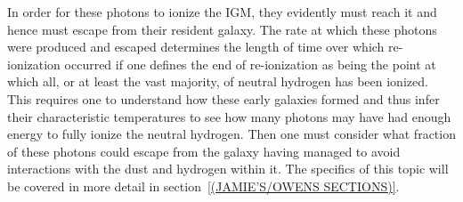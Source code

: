 	In order for these photons to ionize the IGM, they evidently must reach it and hence must escape from their resident galaxy. The rate at which these photons were produced and escaped determines the length of time over which re-ionization occurred if one defines the end of re-ionization as being the point at which all, or at least the vast majority, of neutral hydrogen has been ionized. This requires one to understand how these early galaxies formed and thus infer their characteristic temperatures to see how many photons may have had enough energy to fully ionize the neutral hydrogen. Then one must consider what fraction of these photons could escape from the galaxy having managed to avoid interactions with the dust and hydrogen within it. The specifics of this topic will be covered in more detail in section~\ref{(JAMIE’S/OWENS SECTIONS)}.
